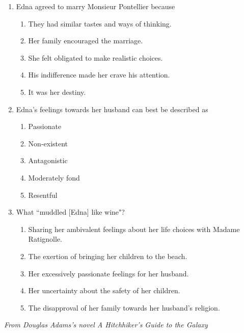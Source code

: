 \documentclass[12pt]{book}
\begin{document}
\newpage
\begin{enumerate}
\item Edna agreed to marry Monsieur Pontellier because

\begin{enumerate}[label=(\Alph*)]
\item They had similar tastes and ways of thinking.
\item Her family encouraged the marriage.
\item She felt obligated to make realistic choices.
\item His indifference made her crave his attention.
\item It was her destiny.
\end{enumerate}

\bigskip
\item Edna's feelings towards her husband can best be described as

\begin{enumerate}[label=(\Alph*)]
\item Passionate
\item Non-existent
\item Antagonistic
\item Moderately fond
\item Resentful 
\end{enumerate}

\bigskip
\item What ``muddled [Edna] like wine"?

\begin{enumerate}[label=(\Alph*)]
\item Sharing her ambivalent feelings about her life choices with Madame Ratignolle.
\item The exertion of bringing her children to the beach.
\item Her excessively passionate feelings for her husband.
\item Her uncertainty about the safety of her children.
\item The disapproval of her family towards her husband's religion.
\end{enumerate}
\end{enumerate}

\newpage
\textit{From Douglas Adams's novel A Hitchhiker's Guide to the Galaxy}
\end{document}
